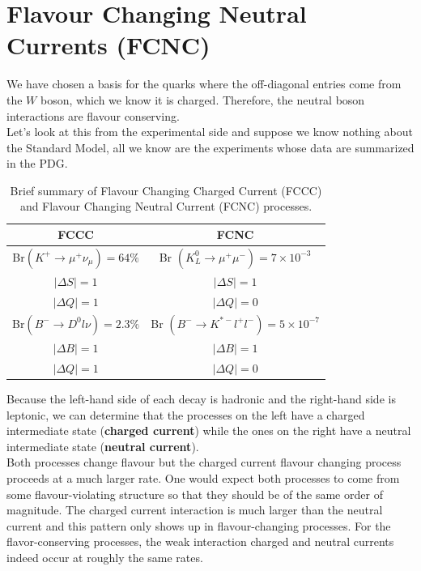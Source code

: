\documentclass[../main.tex]{subfiles}
\begin{document}
\section{Flavour Changing Neutral Currents (FCNC)}
We have chosen a basis for the quarks where the off-diagonal entries come from the $W$ boson, which we know it is charged. Therefore, the neutral boson interactions are flavour conserving.\\
Let's look at this from the experimental side and suppose we know nothing about the Standard Model, all we know are the experiments whose data are summarized in the PDG\cite{pdg}.
\begin{table}[h]
    \centering
    \begin{tabular}{c|c}
    \hline
    \rowcolor{gray!45}FCCC & FCNC\\
    \hline
    Br$(K^+\xrightarrow[]{}\mu^+\nu_\mu)=64\%$ & Br $(K_L^0\xrightarrow[]{}\mu^+\mu^-)=7\times10^{-3}$\\
    $|\Delta S|=1$ & $|\Delta S|=1$\\
    $|\Delta Q|=1$ & $|\Delta Q|=0$\\
    \hline
    Br$(B^-\xrightarrow[]{}D^0l\nu)=2.3\%$ & Br $(B^-\xrightarrow[]{}K^{*-}l^+l^-)=5\times10^{-7}$\\
    $|\Delta B|=1$ & $|\Delta B|=1$\\
    $|\Delta Q|=1$ & $|\Delta Q|=0$\\
    \hline
    \end{tabular}
    \caption{Brief summary of Flavour Changing Charged Current (FCCC) and Flavour Changing Neutral Current (FCNC) processes.}
\end{table}
\newline
Because the left-hand side of each decay is hadronic and the right-hand side is leptonic, we can determine that the processes on the left have a charged intermediate state (\textbf{charged current}) while the ones on the right have a neutral intermediate state (\textbf{neutral current}).\\
Both processes change flavour but the charged current flavour changing process proceeds at a much larger rate. One would expect both processes to come from some flavour-violating structure so that they should be of the same order of magnitude. The charged current interaction is much larger than the neutral current and this pattern only shows up in flavour-changing processes. For the flavor-conserving processes, the weak interaction charged and neutral currents indeed occur at roughly the same rates.
\end{document}
